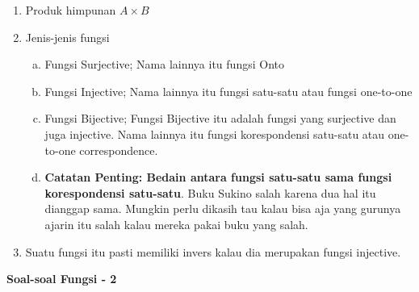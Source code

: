 \documentclass[fleqn, a4paper, 12pt]{article} %
\begin{document}
	\begin{enumerate}
		\item Produk himpunan $A \times B$		
		\item Jenis-jenis fungsi
			\begin{enumerate}[a.]
				\item Fungsi Surjective; Nama lainnya itu fungsi Onto
				\item Fungsi Injective; Nama lainnya itu fungsi satu-satu atau fungsi one-to-one
				\item Fungsi Bijective; Fungsi Bijective itu adalah fungsi yang surjective dan juga injective. Nama lainnya itu fungsi korespondensi satu-satu atau one-to-one correspondence.
				\item \textbf{Catatan Penting: Bedain antara fungsi satu-satu sama fungsi korespondensi satu-satu}. Buku Sukino salah karena dua hal itu dianggap sama. Mungkin perlu dikasih tau kalau bisa aja yang gurunya ajarin itu salah kalau mereka pakai buku yang salah.
			\end{enumerate}
		\item Suatu fungsi itu pasti memiliki invers kalau dia merupakan fungsi injective.
	\end{enumerate}
	
	\textbf{Soal-soal Fungsi - 2}
	
\end{document}
